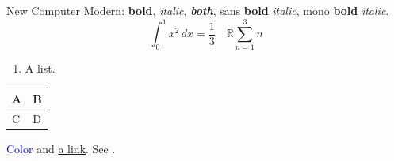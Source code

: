\usepackage{amsmath,amssymb,graphicx,xcolor,geometry,booktabs,enumitem,natbib,hyperref}
\usepackage{newcomputermodern}

New Computer Modern: \textbf{bold}, \textit{italic}, \textbf{\textit{both}},
{\sffamily sans \textbf{bold} \textit{italic}}, {\ttfamily mono \textbf{bold} \textit{italic}}.
\[ \int_0^1 x^2\,dx = \frac13 \quad \mathbb{R} \sum_{n=1}^3 n \]
\begin{enumerate}[label=\alph*)]\item A list.\end{enumerate}
\begin{tabular}{ll}\toprule A & B\\\midrule C & D\\\bottomrule\end{tabular}
\textcolor{blue}{Color} and \href{https://example.com}{a link}. See \citep{knuth}.




